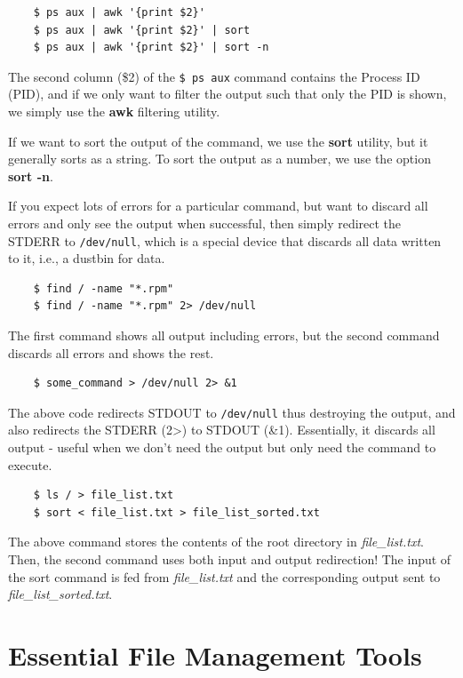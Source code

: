 \documentclass{report}
\begin{document}
	\noindent
	\begin{verbatim}	
	$ ps aux | awk '{print $2}'
	$ ps aux | awk '{print $2}' | sort
	$ ps aux | awk '{print $2}' | sort -n
	\end{verbatim}
	
	\noindent
	The second column (\$2) of the \verb|$ ps aux| command contains the Process ID (PID), and if we only want to filter the output such that only the PID is shown, we simply use the \textbf{awk} filtering utility. 
	
	If we want to sort the output of the command, we use the \textbf{sort} utility, but it generally sorts as a string. To sort the output as a number, we use the option \textbf{sort -n}.
	
	\noindent
	If you expect lots of errors for a particular command, but want to discard all errors and only see the output when successful, then simply redirect the STDERR to \verb|/dev/null|, which is a special device that discards all data written to it, i.e., a dustbin for data. 
	
	\begin{verbatim}	
	$ find / -name "*.rpm"
	$ find / -name "*.rpm" 2> /dev/null
	\end{verbatim}
	
	\noindent
	The first command shows all output including errors, but the second command discards all errors and shows the rest. 	
	
	\begin{verbatim}
	$ some_command > /dev/null 2> &1
	\end{verbatim}
	
	\noindent
	The above code redirects STDOUT to \verb|/dev/null| thus destroying the output, and also redirects the STDERR (2>) to STDOUT (\&1). Essentially, it discards all output - useful when we don't need the output but only need the command to execute.
	
	\begin{verbatim}
	$ ls / > file_list.txt
	$ sort < file_list.txt > file_list_sorted.txt
	\end{verbatim}
	
	\noindent
	The above command stores the contents of the root directory in \textit{file\_list.txt}. Then, the second command uses both input and output redirection! The input of the sort command is fed from \textit{file\_list.txt} and the corresponding output sent to \textit{file\_list\_sorted.txt}.
	
	\chapter{Essential File Management Tools}
\end{document}
